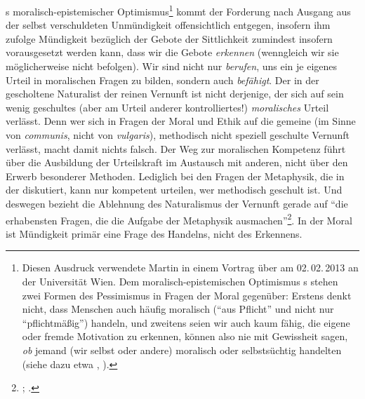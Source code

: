 s moralisch-epistemischer
Optimismus\footnote{\label{Fussnote:moralischepistemischerOptimismus}Diesen
Ausdruck verwendete Martin  in einem Vortrag über
 am 02.\,02.\,2013 an der Universität Wien. Dem
moralisch-epistemischen Optimismus s stehen zwei Formen des
Pessimismus in Fragen der Moral gegenüber: Erstens denkt 
nicht, dass Menschen auch häufig moralisch (\enquote{aus Pflicht} und nicht nur
\enquote{pflichtmäßig}) handeln, und zweitens seien wir auch kaum fähig, die
eigene oder fremde Motivation zu erkennen, können also nie mit Gewissheit sagen,
\emph{ob} jemand (wir selbst oder andere) moralisch oder selbstsüchtig
handelten \mkbibparens{siehe dazu etwa
\cite[][A
222]{Kant:UeberdenGemeinspruch:dasmaginderTheorierichtigseintaugtabernichtfuerdiePraxis1977},
\cite[][VIII: 284.21--28]{Kant:GesammelteWerke1900ff.}}.} kommt der
Forderung nach Ausgang aus der selbst verschuldeten Unmündigkeit offensichtlich
entgegen, insofern ihm zufolge Mündigkeit bezüglich der Gebote der Sittlichkeit
zumindest insofern vorausgesetzt werden kann, dass wir die Gebote
\emph{erkennen} (wenngleich wir sie möglicherweise nicht befolgen).
Wir sind nicht nur \emph{berufen}, uns ein je eigenes Urteil in moralischen Fragen zu
bilden, sondern auch \emph{befähigt}. Der in der  gescholtene Naturalist der reinen Vernunft ist nicht derjenige, der
sich auf sein wenig geschultes (aber am Urteil anderer kontrolliertes!)
\emph{moralisches} Urteil verlässt. Denn wer sich in Fragen der Moral und Ethik
auf die gemeine (im Sinne von \emph{communis}, nicht von \emph{vulgaris}),
methodisch nicht speziell geschulte Vernunft verlässt, macht damit nichts falsch. Der Weg zur moralischen
Kompetenz führt über die Ausbildung der Urteilskraft im Austausch mit anderen,
nicht über den Erwerb besonderer Methoden. Lediglich bei den Fragen der
Metaphysik, die  in der 
diskutiert, kann nur kompetent urteilen, wer methodisch geschult ist. Und
deswegen bezieht  die Ablehnung des Naturalismus der
Vernunft gerade auf \enquote{die erhabensten Fragen, die die Aufgabe der
Metaphysik ausmachen}\footnote{\cite[][B 883]{Kant:KritikderreinenVernunft2003};
\cite[][III: 551.36]{Kant:GesammelteWerke1900ff.}.}. In der Moral ist Mündigkeit
primär eine Frage des Handelns, nicht des Erkennens.

